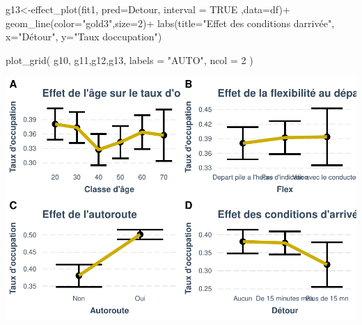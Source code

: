 \documentclass[
]{book}
\newenvironment{Shaded}{\begin{snugshade}}{\end{snugshade}}
\newcommand{\AttributeTok}[1]{\textcolor[rgb]{0.77,0.63,0.00}{#1}}
\newcommand{\ConstantTok}[1]{\textcolor[rgb]{0.00,0.00,0.00}{#1}}
\newcommand{\DecValTok}[1]{\textcolor[rgb]{0.00,0.00,0.81}{#1}}
\newcommand{\FunctionTok}[1]{\textcolor[rgb]{0.00,0.00,0.00}{#1}}
\newcommand{\NormalTok}[1]{#1}
\newcommand{\OtherTok}[1]{\textcolor[rgb]{0.56,0.35,0.01}{#1}}
\newcommand{\SpecialCharTok}[1]{\textcolor[rgb]{0.00,0.00,0.00}{#1}}
\newcommand{\StringTok}[1]{\textcolor[rgb]{0.31,0.60,0.02}{#1}}
\begin{document}
\begin{Shaded}
\begin{Highlighting}[]
\NormalTok{g13}\OtherTok{\textless{}{-}}\FunctionTok{effect\_plot}\NormalTok{(fit1, }\AttributeTok{pred=}\NormalTok{Detour, }\AttributeTok{interval =} \ConstantTok{TRUE}\NormalTok{ ,}\AttributeTok{data=}\NormalTok{df)}\SpecialCharTok{+}
  \FunctionTok{geom\_line}\NormalTok{(}\AttributeTok{color=}\StringTok{"gold3"}\NormalTok{,}\AttributeTok{size=}\DecValTok{2}\NormalTok{)}\SpecialCharTok{+}
  \FunctionTok{labs}\NormalTok{(}\AttributeTok{title=}\StringTok{"Effet des conditions d\textquotesingle{}arrivée"}\NormalTok{, }\AttributeTok{x=}\StringTok{"Détour"}\NormalTok{,}
       \AttributeTok{y=}\StringTok{"Taux d\textquotesingle{}occupation"}\NormalTok{)}

\FunctionTok{plot\_grid}\NormalTok{(}
\NormalTok{  g10, g11,g12,g13,}
  \AttributeTok{labels =} \StringTok{"AUTO"}\NormalTok{, }\AttributeTok{ncol =} \DecValTok{2}
\NormalTok{)}
\end{Highlighting}
\end{Shaded}

\includegraphics{bookdown-demo_files/figure-latex/0911-1.pdf}
\end{document}
